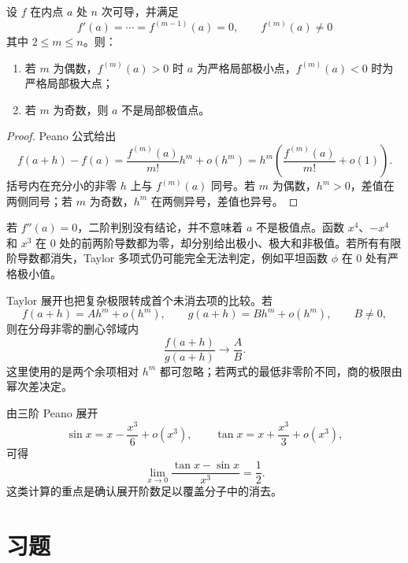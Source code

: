 \begin{theorem}[首个非零高阶导数判别]
设 \(f\) 在内点 \(a\) 处 \(n\) 次可导，并满足
\[
 f'(a)=\cdots=f^{(m-1)}(a)=0,
 \qquad f^{(m)}(a)\ne0
\]
其中 \(2\le m\le n\)。则：
\begin{enumerate}
 \item 若 \(m\) 为偶数，\(f^{(m)}(a)>0\) 时 \(a\) 为严格局部极小点，\(f^{(m)}(a)<0\) 时为严格局部极大点；
 \item 若 \(m\) 为奇数，则 \(a\) 不是局部极值点。
\end{enumerate}
\end{theorem}

\begin{proof}
Peano 公式给出
\[
 f(a+h)-f(a)
 =\frac{f^{(m)}(a)}{m!}h^m+o(h^m)
 =h^m\left(\frac{f^{(m)}(a)}{m!}+o(1)\right).
\]
括号内在充分小的非零 \(h\) 上与 \(f^{(m)}(a)\) 同号。若 \(m\) 为偶数，\(h^m>0\)，差值在两侧同号；若 \(m\) 为奇数，\(h^m\) 在两侧异号，差值也异号。
\end{proof}

若 \(f''(a)=0\)，二阶判别没有结论，并不意味着 \(a\) 不是极值点。函数 \(x^4\)、\(-x^4\) 和 \(x^3\) 在 \(0\) 处的前两阶导数都为零，却分别给出极小、极大和非极值。若所有有限阶导数都消失，Taylor 多项式仍可能完全无法判定，例如平坦函数 \(\phi\) 在 \(0\) 处有严格极小值。

Taylor 展开也把复杂极限转成首个未消去项的比较。若
\[
 f(a+h)=A h^m+o(h^m),\qquad
 g(a+h)=B h^m+o(h^m),\qquad B\ne0,
\]
则在分母非零的删心邻域内
\[
 \frac{f(a+h)}{g(a+h)}\longrightarrow\frac AB.
\]
这里使用的是两个余项相对 \(h^m\) 都可忽略；若两式的最低非零阶不同，商的极限由幂次差决定。

\begin{example}
由三阶 Peano 展开
\[
 \sin x=x-\frac{x^3}{6}+o(x^3),
 \qquad
 \tan x=x+\frac{x^3}{3}+o(x^3),
\]
可得
\[
 \lim_{x\to0}\frac{\tan x-\sin x}{x^3}=\frac12.
\]
这类计算的重点是确认展开阶数足以覆盖分子中的消去。
\end{example}

\section*{习题}

